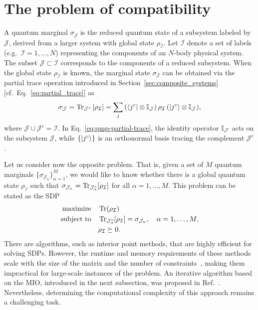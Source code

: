 \section{The problem of compatibility}
\label{sec:qmp-compatibility}

A quantum marginal $\sigma_{\mathcal{J}}$ is the reduced quantum state of a subsystem labeled by $\mathcal{J}$, derived from a larger system with global state $\rho_{\mathcal{I}}$. Let $\mathcal{I}$ denote a set of labels (e.g.\ $\mathcal{I} = 1, \ldots, N$) representing the components of an $N$-body physical system. The subset $\mathcal{J} \subset \mathcal{I}$ corresponds to the components of a reduced subsystem. When the global state $\rho_{\mathcal{I}}$ is known, the marginal state $\sigma_{\mathcal{J}}$ can be obtained via the partial trace operation introduced in Section~\ref{sec:composite_systems} [cf.\ Eq.~\eqref{eq:partial_trace}] as
\begin{equation}
\label{eq:qmp-partial-trace}
\sigma_{\mathcal{J}} = \Tr_{\mathcal{J}^c} \qty[\rho_{\mathcal{I}}]
= \sum_{j} \qty( \bra{j^c} \otimes \mathbb{I}_{\mathcal{J}} )\, \rho_{\mathcal{I}}\, \qty( \ket{j^c} \otimes \mathbb{I}_{\mathcal{J}} ),
\end{equation}
where $\mathcal{J} \cup \mathcal{J}^c = \mathcal{I}$. In Eq.~\eqref{eq:qmp-partial-trace}, the identity operator $\mathbb{I}_{\mathcal{J}}$ acts on the subsystem $\mathcal{J}$, while $\{\ket{j^c}\}$ is an orthonormal basis tracing the complement $\mathcal{J}^c$.

Let us consider now the opposite problem. That is, given a set of $M$ quantum marginals $\{\sigma_{\mathcal{J}_\alpha}\}_{\alpha=1}^{M}$, we would like to know whether there is a global quantum state $\rho_{\mathcal{I}}$ such that $\sigma_{\mathcal{J}_\alpha} = \Tr_{\mathcal{J}_\alpha^c}[\rho_{\mathcal{I}}]$ for all $\alpha = 1, \ldots, M$. This problem can be stated as the SDP~\cite{skrzypczyk2023sdp}
\begin{equation}
\label{eq:qmp-sdp}
\begin{aligned}
\text{maximize} \quad & \Tr(\rho_{\mathcal{I}}) \\
\text{subject to} \quad & \Tr_{\mathcal{J}_\alpha^c}[\rho_{\mathcal{I}}] = \sigma_{\mathcal{J}_\alpha}, \quad \alpha = 1, \ldots, M, \\
& \rho_{\mathcal{I}} \succeq 0.
\end{aligned}
\end{equation}
There are algorithms, such as interior point methods, that are highly efficient for solving SDPs. However, the runtime and memory requirements of these methods scale with the size of the matrix and the number of constraints~\cite{jiang2020sdp, zhang2018sdp}, making them impractical for large-scale instances of the problem. An iterative algorithm based on the MIO, introduced in the next subsection, was proposed in Ref.~\cite{uzcategui2022mio}. Nevertheless, determining the computational complexity of this approach remains a challenging task.

